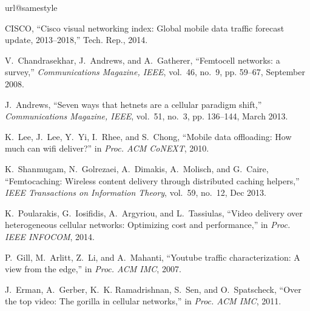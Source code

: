 \documentclass[10pt,conference,letterpaper]{IEEEtran}
\begin{document}
\begin{thebibliography}{10}
\providecommand{\url}[1]{#1}
\csname url@samestyle\endcsname
\providecommand{\newblock}{\relax}
\providecommand{\bibinfo}[2]{#2}
\providecommand{\BIBentrySTDinterwordspacing}{\spaceskip=0pt\relax}
\providecommand{\BIBentryALTinterwordstretchfactor}{4}
\providecommand{\BIBentryALTinterwordspacing}{\spaceskip=\fontdimen2\font plus
\BIBentryALTinterwordstretchfactor\fontdimen3\font minus
  \fontdimen4\font\relax}
\providecommand{\BIBforeignlanguage}[2]{{\expandafter\ifx\csname l@#1\endcsname\relax
\typeout{** WARNING: IEEEtran.bst: No hyphenation pattern has been}\typeout{** loaded for the language `#1'. Using the pattern for}\typeout{** the default language instead.}\else
\language=\csname l@#1\endcsname
\fi
#2}}
\providecommand{\BIBdecl}{\relax}
\BIBdecl

CISCO, ``Cisco visual networking index: Global mobile data traffic forecast
  update, 2013--2018,'' Tech. Rep., 2014.

V.~Chandrasekhar, J.~Andrews, and A.~Gatherer, ``Femtocell networks: a
  survey,'' \emph{Communications Magazine, IEEE}, vol.~46, no.~9, pp. 59--67,
  September 2008.

J.~Andrews, ``Seven ways that hetnets are a cellular paradigm shift,''
  \emph{Communications Magazine, IEEE}, vol.~51, no.~3, pp. 136--144, March
  2013.

K.~Lee, J.~Lee, Y.~Yi, I.~Rhee, and S.~Chong, ``Mobile data offloading: How
  much can wifi deliver?'' in \emph{Proc. ACM CoNEXT}, 2010.

K.~Shanmugam, N.~Golrezaei, A.~Dimakis, A.~Molisch, and G.~Caire,
  ``Femtocaching: Wireless content delivery through distributed caching
  helpers,'' \emph{IEEE Transactions on Information Theory}, vol.~59, no.~12,
  Dec 2013.

K.~Poularakis, G.~Iosifidis, A.~Argyriou, and L.~Tassiulas, ``Video delivery
  over heterogeneous cellular networks: Optimizing cost and performance,'' in
  \emph{Proc. IEEE INFOCOM}, 2014.

P.~Gill, M.~Arlitt, Z.~Li, and A.~Mahanti, ``Youtube traffic characterization:
  A view from the edge,'' in \emph{Proc. ACM IMC}, 2007.

J.~Erman, A.~Gerber, K.~K. Ramadrishnan, S.~Sen, and O.~Spatscheck, ``Over the
  top video: The gorilla in cellular networks,'' in \emph{Proc. ACM IMC}, 2011.


\end{thebibliography}
\end{document}
